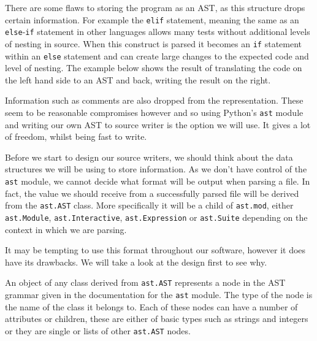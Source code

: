 \documentclass[twoside,a4paper]{report}
\begin{document}
There are some flaws to storing the program as an AST, as this structure drops certain information.
For example the \texttt{elif} statement, meaning the same as an \texttt{else}-\texttt{if} statement in other languages allows many tests without
additional levels of nesting in source. When this construct is parsed it becomes an \texttt{if} statement within an \texttt{else} statement and
can create large changes to the expected code and level of nesting. The example below shows the result of translating the code on the left hand
side to an AST and back, writing the result on the right.

\begin{minipage}[b]{0.4\linewidth}
\centering

\end{minipage}
\hspace{1cm}
\begin{minipage}[b]{0.5\linewidth}
\centering

\end{minipage}

Information such as comments are also dropped from the representation. These seem to be reasonable compromises however and so
using Python's \texttt{ast} module and writing our own AST to source writer is the option we will use. It gives a lot of freedom, whilst
being fast to write.

Before we start to design our source writers, we should think about the data structures we will be using to store information. As we don't have
control of the \texttt{ast} module, we cannot decide what format will be output when parsing a file. In fact, the value we should receive from
a successfully parsed file will be derived from the \texttt{ast.AST} class. More specifically it will be a child of \texttt{ast.mod}, either
\texttt{ast.Module}, \texttt{ast.Interactive}, \texttt{ast.Expression} or \texttt{ast.Suite} depending on the context in which we are parsing.

It may be tempting to use this format throughout our software, however it does have its drawbacks. We will take a look at the design first to see why.

An object of any class derived from \texttt{ast.AST} represents a node in the AST grammar given in the documentation for the \texttt{ast} module. The
type of the node is the name of the class it belongs to. Each of these nodes can have a number of attributes or children, these are either of basic
types such as strings and integers or they are single or lists of other \texttt{ast.AST} nodes.
\end{document}
